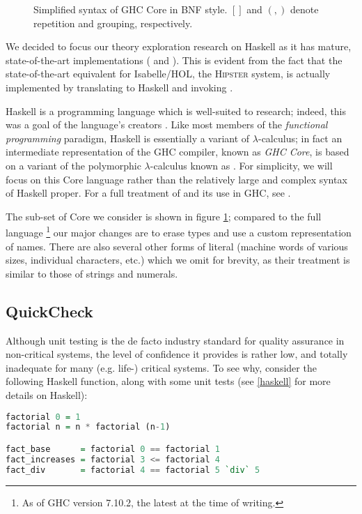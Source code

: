 \begin{figure}
  \caption{Simplified syntax of GHC Core in BNF style. $[]$ and $(,)$ denote repetition and grouping, respectively.}
  \label{coresyntax}
\end{figure}

We decided to focus our theory exploration research on Haskell as it has mature, state-of-the-art implementations (\qspec{} \citep{QuickSpec} and \hspec{} \citep{claessen2013automating}). This is evident from the fact that the state-of-the-art equivalent for Isabelle/HOL, the \textsc{Hipster} \citep{Hipster} system, is actually implemented by translating to Haskell and invoking \hspec{}.

Haskell is a programming language which is well-suited to research; indeed, this was a goal of the language's creators \citep{marlow2010haskell}. Like most members of the \emph{functional programming} paradigm, Haskell is essentially a variant of $\lambda$-calculus; in fact an intermediate representation of the \textsc{GHC} compiler, known as \emph{GHC Core}, is based on a variant of the polymorphic $\lambda$-calculus known as \fc{}. For simplicity, we will focus on this Core language rather than the relatively large and complex syntax of Haskell proper. For a full treatment of \fc{} and its use in GHC, see \citep[Appendix C]{sulzmann2007system}.

The sub-set of Core we consider is shown in figure \ref{coresyntax}; compared to the full language \footnote{As of GHC version 7.10.2, the latest at the time of writing.} our major changes are to erase types and use a custom representation of names. There are also several other forms of literal (machine words of various sizes, individual characters, etc.) which we omit for brevity, as their treatment is similar to those of strings and numerals.

\subsection{QuickCheck}
\label{quickcheck}

Although unit testing is the de facto industry standard for quality assurance in non-critical systems, the level of confidence it provides is rather low, and totally inadequate for many (e.g. life-) critical systems. To see why, consider the following Haskell function, along with some unit tests (see \ref{haskell} for more details on Haskell):

\begin{lstlisting}[language=Haskell, xleftmargin=.2\textwidth, xrightmargin=.2\textwidth]
factorial 0 = 1
factorial n = n * factorial (n-1)

fact_base      = factorial 0 == factorial 1
fact_increases = factorial 3 <= factorial 4
fact_div       = factorial 4 == factorial 5 `div` 5
\end{lstlisting}

